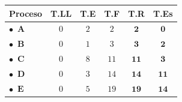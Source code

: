 \documentclass[10pt, a4paper]{article}
\begin{document}
\begin{minipage}{\linewidth}
\begin{minipage}[t]{0.275\linewidth}
\centering\footnotesize\setlength{\tabcolsep}{3.5pt}\renewcommand{\arraystretch}{1.1}
\begin{tabular}{lccccc}\toprule
\textbf{Proceso} & \textbf{T.LL} & \textbf{T.E} & \textbf{T.F} & \textbf{T.R} & \textbf{T.Es} \\ \midrule
\textcolor{col0}{$\bullet$}\ \textcolor{col0}{$\mathbf{A}$} & $0$ & $2$ & $2$ & \textcolor{tr}{$\boldsymbol{2}$} & \textcolor{es}{$\boldsymbol{0}$} \\
\textcolor{col1}{$\bullet$}\ \textcolor{col1}{$\mathbf{B}$} & $0$ & $1$ & $3$ & \textcolor{tr}{$\boldsymbol{3}$} & \textcolor{es}{$\boldsymbol{2}$} \\
\textcolor{col2}{$\bullet$}\ \textcolor{col2}{$\mathbf{C}$} & $0$ & $8$ & $11$ & \textcolor{tr}{$\boldsymbol{11}$} & \textcolor{es}{$\boldsymbol{3}$} \\
\textcolor{col3}{$\bullet$}\ \textcolor{col3}{$\mathbf{D}$} & $0$ & $3$ & $14$ & \textcolor{tr}{$\boldsymbol{14}$} & \textcolor{es}{$\boldsymbol{11}$} \\
\textcolor{col4}{$\bullet$}\ \textcolor{col4}{$\mathbf{E}$} & $0$ & $5$ & $19$ & \textcolor{tr}{$\boldsymbol{19}$} & \textcolor{es}{$\boldsymbol{14}$} \\
\bottomrule\end{tabular}\\[5pt]
\hspace{1.5mm}\hspace{1.5mm}
\end{minipage}
\end{minipage}
\par\vspace{0.35cm}
\end{document}

